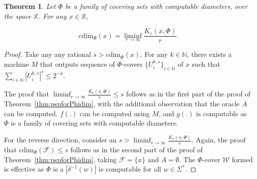 \documentclass[11pt]{article}
\newtheorem{theorem}{Theorem}
\newcommand{\cdim}{\mathrm{cdim}}
\newcommand{\F}{{\mathcal{F}}}
\newcommand{\X}{{\mathbb{X}}}
\newcommand{\UU}{{\mathcal{W}}}
\renewcommand{\F}{\mathcal{F}}
\newcommand{\U}{U}
\newcommand{\x}{x}
\begin{document}
\begin{theorem} \label{thm:KCCharnofCPhidim}
	Let  $\Phi$ be a family of covering sets with computable diameters, over the space $\X$. For any $\x \in \X$,
	
	$$\cdim_{\Phi}(\x) = \liminf_{r \rightarrow \infty} \frac{K_r(\x, \Phi)}{r}.$$
\end{theorem}
\begin{proof} 
		Take any any rational $s > \cdim_\Phi(x)$.  For any $k \in \mathbb{N}$, there exists a machine $M$ that outputs sequence of $\Phi$-covers $\{\U_i^{k,s}\}_{i \in \mathbb{N}}$ of $x$ such that
	\(
	\sum_{i \in \mathbb{N}} |\U_i^{k,s}|^s \leq 2^{-k}.
	\)
	
	The proof that $\liminf_{r \rightarrow \infty} \frac{K_r(\x, \Phi)}{r} \leq s$ follows as in the first part of the proof of Theorem~\ref{thm:pspforPhidim}, with the additional observation that the oracle $A$ can be computed. $f(.)$ can be computed using $M$, and $g(.)$ is computable as $\Phi$ is a family of covering sets with computable diameters.
	
	For the reverse direction, consider an $s > \liminf_{r \rightarrow \infty} \frac{K_r(\x, \Phi)}{r}$. Again, the proof that $ \cdim_\Phi(\mathcal{F}) \leq s$ follows as in the second part of the proof of Theorem~\ref{thm:pspforPhidim}, taking $\F = \{x\}$ and $A = \emptyset$. The $\Phi$-cover $\UU$ formed is effective as $\Phi$ is a $|\delta^{-1}(w)|$ is computable for all $w \in \Sigma^*$.
\end{proof}
\end{document}
